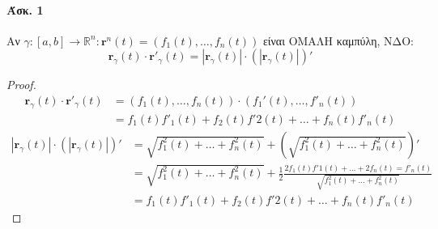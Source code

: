 \documentclass[11pt,a4paper,titlepage,draft]{article}
\begin{document}
\paragraph{Άσκ. 1}
Αν \(\gamma:[a,b] \to  \mathbb R ^n: \mathbf r^n (t)
= \left( f_1(t),\dots,f_n(t) \right) \) είναι ΟΜΑΛΗ καμπύλη, ΝΔΟ:
\[
\mathbf r_\gamma (t) \cdot \mathbf r' _\gamma(t) = |\mathbf r _\gamma (t)| \cdot
\left( |\mathbf r_\gamma(t)| \right)'
\]
\begin{proof}
\begin{align*}
 \mathbf r_\gamma(t) \cdot   \mathbf r'_\gamma(t)
 &= \left( f_1(t),\dots ,f_n(t) \right) \cdot \left( f_1'(t),\dots,f'_n(t) \right) \\
&= f_1(t)f'_1(t)+f_2(t)f'2(t)+\dots+f_n(t)f'_n(t)
\end{align*}
\begin{align*}
 |\mathbf r _\gamma (t)| \cdot \left( |\mathbf r_\gamma(t)| \right)'
 &= \sqrt{f_1^2(t) + \dots + f_n^2(t)} + \left( \sqrt{f_1^2(t) + \dots + f_n^2(t)} \right)' \\
 &= \sqrt{f_1^2(t) + \dots + f_n^2(t)} + \frac{1}{2} \frac{2f_1(t)f'1(t)+\dots+2f_n(t)=f'_n(t)}{\sqrt{f_1^2(t) + \dots + f_n^2(t)}} \\
 &= f_1(t)f'_1(t)+f_2(t)f'2(t)+\dots+f_n(t)f'_n(t)
\end{align*}
\end{proof}
\end{document}
